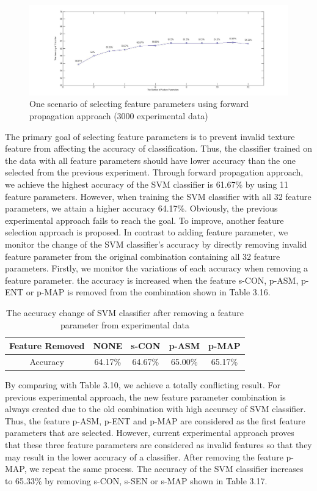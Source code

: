 \begin{figure}
\includegraphics[width=\linewidth]{fig3_7}
\caption{One scenario of selecting feature parameters using forward propagation approach (3000 experimental data)}
\end{figure}
The primary goal of selecting feature parameters is to prevent invalid texture feature from affecting the accuracy of classification. Thus, the classifier trained on the data with all feature parameters should have lower accuracy than the one selected from the previous experiment. Through forward propagation approach, we achieve the highest accuracy of the SVM classifier is 61.67\% by using 11 feature parameters. However, when training the SVM classifier with all 32 feature parameters, we attain a higher accuracy 64.17\%. Obviously, the previous experimental approach fails to reach the goal. To improve, another feature selection approach is proposed. In contrast to adding feature parameter, we monitor the change of the SVM classifier's accuracy by directly removing invalid feature parameter from the original combination containing all 32 feature parameters. Firstly, we monitor the variations of each accuracy when removing a feature parameter. the accuracy is increased when the feature s-CON, p-ASM, p-ENT or p-MAP is removed from the combination shown in Table 3.16. 
\begin{table}[!h]
\begin{center}
\renewcommand{\arraystretch}{0.5}
\begin{tabular}{|| c | c | c c c||}
\hline
 Feature Removed & NONE & s-CON & p-ASM & p-MAP  \\
 \hline
 Accuracy & 64.17\% & 64.67\% & 65.00\% & 65.17\% \\
 \hline
\end{tabular}
\end{center}
\caption{The accuracy change of SVM classifier after removing a feature parameter from experimental data}
\end{table}
By comparing with Table 3.10, we achieve a totally conflicting result. For previous experimental approach, the new feature parameter combination is always created due to the old combination with high accuracy of SVM classifier. Thus, the feature p-ASM, p-ENT and p-MAP are considered as the first feature parameters that are selected. However, current experimental approach proves that these three feature parameters are considered as invalid features so that they may result in the lower accuracy of a classifier. After removing the feature p-MAP, we repeat the same process. The accuracy of the SVM classifier increases to 65.33\% by removing s-CON, s-SEN or s-MAP shown in Table 3.17.
